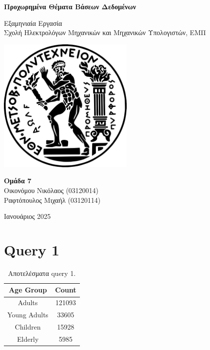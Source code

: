 \documentclass[a4paper,12pt]{article}
\begin{document}
\begin{otherlanguage}{greek}

\begin{titlepage}
    	\centering
    	\vspace*{2cm}

    	\Huge
    	\textbf{Προχωρημένα Θέματα Βάσεων Δεδομένων}

    	\vspace{0.5cm}
    	\LARGE
    	Εξαμηνιαία Εργασία \\
	\Large
    	Σχολή Ηλεκτρολόγων Μηχανικών και Μηχανικών Υπολογιστών, ΕΜΠ

    	\vspace{1.5cm}
    	\includegraphics[width=0.5\textwidth]{ntua.png}

    	\vfill

   	\Large
	\textbf{Ομάδα 7} \\
	Οικονόμου Νικόλαος (03120014) \\
	Ραφτόπουλος Μιχαήλ (03120114) \\

	\vfill

	\normalsize
    	Ιανουάριος 2025

    	\vspace{0.8cm}
\end{titlepage}

\newpage

\tableofcontents
\newpage


\section*{Query 1}
	\FloatBarrier
	\lipsum[1]
	\begin{table}[h]
		\centering
		\begin{tabular}{cc}
			Age Group & Count \\
			\hline
			Adults & 121093 \\
			Young Adults & 33605 \\
			Children & 15928 \\
			Elderly & 5985
		\end{tabular}
		\caption{Αποτελέσματα query 1.}
	\end{table}
	\FloatBarrier


\end{otherlanguage}
\end{document}
